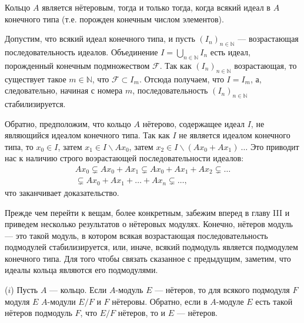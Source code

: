 \documentclass{../../template/mai_book}
\begin{document}
\begin{determ}
\textit{\indent} Кольцо $A$ является нётеровым, тогда и только тогда, когда всякий идеал в $A$ конечного типа (т.е. порожден конечным числом элементов).
\end{determ}

\begin{myproof}
Допустим, что всякий идеал конечного типа, и пусть $(I_n)_{n \in \mathds{N}}$ — возрастающая последовательность идеалов. Объединение $I = \bigcup_{n \in \mathds{N}} I_n$ есть идеал, порожденный конечным подмножеством $\mathcal{F}$. Так как $(I_n)_{n \in \mathds{N}}$ возрастающая, то существует такое $m \in \mathds{N}$, что $\mathcal{F} \subset I_m$. Отсюда получаем, что $I = I_m$, а, следовательно, начиная с номера $m$, последовательность $(I_n)_{n \in \mathds{N}}$ стабилизируется.

\newpage
\noindent Обратно, предположим, что кольцо $A$ нётерово, содержащее идеал $I$, не являющийся идеалом конечного типа. Так как $I$ не является идеалом конечного типа, то $x_0 \in I$, затем $x_1 \in I \backslash A x_0$, затем $x_2 \in I \backslash (A x_0 + A x_1 )\:\dots$ Это приводит нас к наличию строго воэрастающей последовательности идеалов:
\begin{align*}
Ax_0 \varsubsetneq Ax_0 + Ax_1 \varsubsetneq Ax_0 + Ax_1 + Ax_2 \varsubsetneq \dots \\
\varsubsetneq Ax_0 + Ax_1 + \dots + Ax_n \varsubsetneq \dots\text{,}
\end{align*}
что заканчивает доказательство.
\end{myproof}
Прежде чем перейти к вещам, более конкретным, забежим вперед в главу III и приведем несколько результатов о нётеровых модулях. Конечно, нётеров модуль — это такой модуль, в котором всякая возрастающая последовательность подмодулей стабилизируется, или, иначе, всякий подмодуль является подмодулем конечного типа. Для того чтобы связать сказанное с предыдущим, заметим, что идеалы кольца являются его подмодулями.

\begin{predl}
\textit{\indent} ($i$) Пусть $A$ — кольцо. Если $A$-модуль $E$ — нётеров, то для всякого подмодуля $F$ модуля $E$ $A$-модули $E/F$ и $F$ нётеровы. Обратно, если в $A$-модуле $E$ есть такой нётеров подмодуль $F$, что $E/F$ нётеров, то и $E$ — нётеров.
\end{predl}
\end{document}
